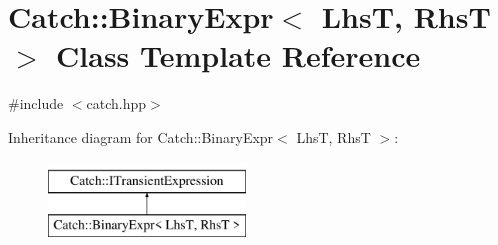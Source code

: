\hypertarget{class_catch_1_1_binary_expr}{}\section{Catch\+::Binary\+Expr$<$ LhsT, RhsT $>$ Class Template Reference}
\label{class_catch_1_1_binary_expr}


{\ttfamily \#include $<$catch.\+hpp$>$}

Inheritance diagram for Catch\+::Binary\+Expr$<$ LhsT, RhsT $>$\+:\begin{figure}[H]
\begin{center}
\leavevmode
\includegraphics[height=2.000000cm]{class_catch_1_1_binary_expr}
\end{center}
\end{figure}
